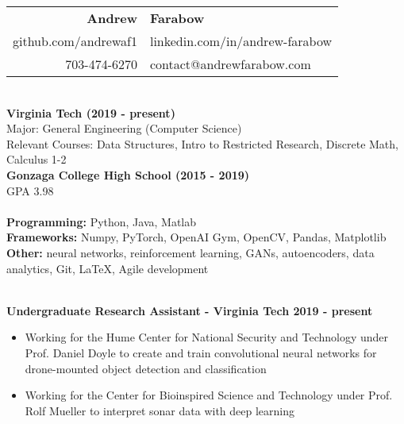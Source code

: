 \documentclass{article}
\begin{document}
  \begin{center}
    \begin{tabular}{r l}
      {\huge\textbf{Andrew}} & {\huge\textbf{Farabow}} \\
      \hspace{35pt} github.com/andrewaf1 & linkedin.com/in/andrew-farabow \\
      703-474-6270 & contact@andrewfarabow.com \\
    \end{tabular}


  \begin{flushleft}
    \begin{multicols}{2}
      {\large\textbf{\underline{}}} \\
       \textbf{Virginia Tech	(2019 - present)} \\
      Major: General Engineering (Computer Science) \\
      Relevant Courses: Data Structures, Intro to Restricted Research, Discrete Math, Calculus 1-2 \\
      \textbf{Gonzaga College High School	(2015 - 2019)} \\
      GPA 3.98 \\
     

    \columnbreak
    {\large\textbf{\underline{}}} \\
    {\textbf{Programming:}} Python, Java, Matlab \\
    {\textbf{Frameworks:}} Numpy, PyTorch, OpenAI Gym, OpenCV, Pandas, Matplotlib \\
    {\textbf{Other:}} neural networks, reinforcement learning, GANs, autoencoders, data analytics, Git, LaTeX, Agile development \\

    \end{multicols}

    {\large\textbf{\underline{}}} \\
    \textbf{Undergraduate Research Assistant - Virginia Tech \hfill 2019 - present}
    \begin{itemize}
      \item Working for the Hume Center for National Security and Technology under Prof. Daniel Doyle to create and train convolutional neural networks for drone-mounted object detection and classification
      \item Working for the Center for Bioinspired Science and Technology under Prof. Rolf Mueller to interpret sonar data with deep learning
    \end{itemize}



\end{flushleft}
\end{center}
\end{document}
